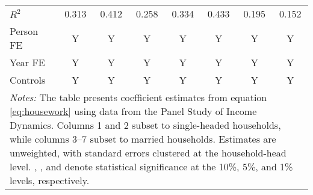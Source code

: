 {\begin{tabular}{l*{7}{c}}
\(R^{2}\)           &       0.313         &       0.412         &       0.258         &       0.334         &       0.433         &       0.195         &       0.152         \\
Person FE           &           Y         &           Y         &           Y         &           Y         &           Y         &           Y         &           Y         \\
Year FE             &           Y         &           Y         &           Y         &           Y         &           Y         &           Y         &           Y         \\
Controls            &           Y         &           Y         &           Y         &           Y         &           Y         &           Y         &           Y         \\
\bottomrule
\multicolumn{8}{p{16cm}}{\footnotesize \textit{Notes:} The table presents coefficient estimates from equation \ref{eq:housework} using data from the Panel Study of Income Dynamics. Columns 1 and 2 subset to single-headed households, while columns 3--7 subset to married households. Estimates are unweighted, with standard errors clustered at the household-head level. \sym{*}, \sym{**}, and \sym{***} denote statistical significance at the 10\%, 5\%, and 1\% levels, respectively.}\\
\end{tabular}
}
